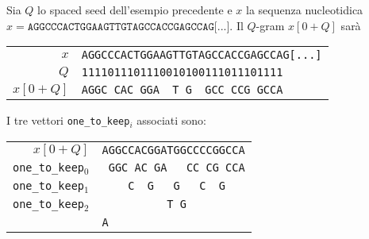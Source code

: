 \begin{example}
	Sia $Q$ lo spaced seed dell'esempio precedente e $x$ la sequenza nucleotidica $x = \texttt{AGGCCCACTGGAAGTTGTAGCCACCGAGCCAG[...]}$. Il $Q$-gram $x[0 + Q]$ sarà 
	\begin{center}
		\begin{tabular}{r || l}
			$x$ & \texttt{AGGCCCACTGGAAGTTGTAGCCACCGAGCCAG[...]} \\
			$Q$ & \texttt{1111011101110010100111011101111} \\
			$x[0 + Q]$ & \texttt{AGGC\ CAC\ GGA\ \ T\ G\ \ GCC\ CCG\ GCCA} \\
		\end{tabular}
	\end{center}
	
	I tre vettori \verb|one_to_keep|$_i$ associati sono:
	\begin{center}
		\begin{tabular}{r || l}
			$x[0 + Q]$ & \texttt{AGGCCACGGATGGCCCCGGCCA} \\
			\verb|one_to_keep|$_0$ & \texttt{\ GGC\ AC\ GA\ \ \ CC\ CG\ CCA} \\
			\verb|one_to_keep|$_1$ & \texttt{\ \ \ \ C\ \ G\ \ \ G\ \ \ C\ \ G\ \ \ } \\
			\verb|one_to_keep|$_2$ & \texttt{\ \ \ \ \ \ \ \ \ \ T\ G\ \ \ \ \ \ \ \ \ } \\
			& \texttt{A\ \ \ \ \ \ \ \ \ \ \ \ \ \ \ } \\
		\end{tabular}
	\end{center}
	

\end{example}
